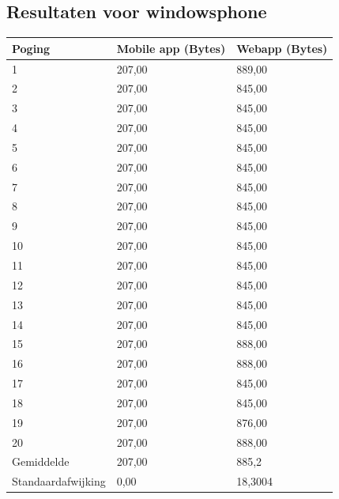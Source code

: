 \documentclass[pdftex,a4paper,12pt,twoside]{report}
\begin{document}
\subsection{Resultaten voor windowsphone}
\begin{center}
  \begin{tabular}{ | l | l | l |}
      \hline
      Poging & Mobile app (Bytes) & Webapp (Bytes)
      \\ \hline
      1 & 207,00 & 889,00
      \\ \hline
      2 & 207,00 & 845,00
      \\ \hline
      3 & 207,00 & 845,00
      \\ \hline
      4 & 207,00 & 845,00
      \\ \hline
      5 & 207,00 & 845,00
      \\ \hline
      6 & 207,00 & 845,00
      \\ \hline
      7 & 207,00 & 845,00
      \\ \hline
      8 & 207,00 & 845,00
      \\ \hline
      9 & 207,00 & 845,00
      \\ \hline
      10 & 207,00 & 845,00
      \\ \hline
      11 & 207,00 & 845,00
      \\ \hline
      12 & 207,00 & 845,00
      \\ \hline
      13 & 207,00 & 845,00
      \\ \hline
      14 & 207,00 & 845,00
      \\ \hline
      15 & 207,00 & 888,00
      \\ \hline
      16 & 207,00 & 888,00
      \\ \hline
      17 & 207,00 & 845,00
      \\ \hline
      18 & 207,00 & 845,00
      \\ \hline
      19 & 207,00 & 876,00
      \\ \hline
      20 & 207,00 & 888,00
      \\ \hline
      Gemiddelde & 207,00 & 885,2
      \\ \hline
      Standaardafwijking & 0,00 & 18,3004
      \\ \hline
  \end{tabular}
\end{center}
\end{document}
